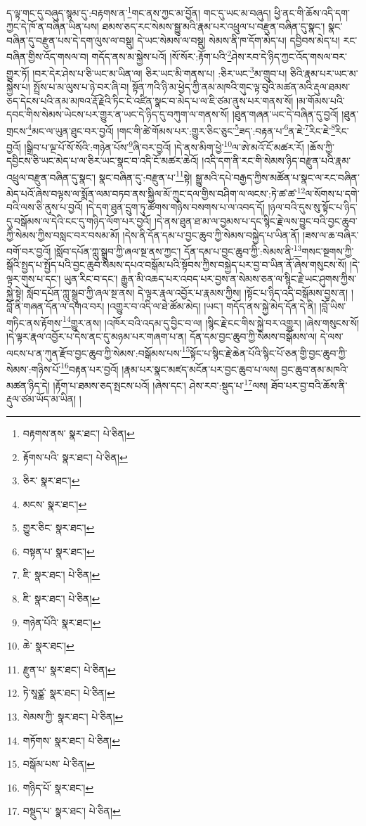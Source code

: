 ད་ལྟ་གང་དུ་བཞུད་སྙམ་དུ་:བརྟགས་ན་\footnote{བརྟགས་ནས་  སྣར་ཐང་།  པེ་ཅིན། }གང་ནས་ཀྱང་མ་བྱོན། གང་དུ་ཡང་མ་བཞུད། ཕྱི་ནང་གི་ཆོས་འདི་དག་ཀྱང་དེ་ཁོ་ན་བཞིན་ཡིན་པས། ཐམས་ཅད་རང་སེམས་སྒྱུ་མའི་རྣམ་པར་འཕྲུལ་པ་བརྫུན་བཞིན་དུ་སྣང་། སྣང་བཞིན་དུ་བརྫུན་པས་དེ་དག་ལུས་ལ་བསྡུ། དེ་ཡང་སེམས་ལ་བསྡུ། སེམས་ནི་ཁ་དོག་མེད་པ། དབྱིབས་མེད་པ། རང་བཞིན་གྱིས་འོད་གསལ་བ། གདོད་ནས་མ་སྐྱེས་པའོ། །སོ་སོར་:རྟོག་པའི་\footnote{རྟོགས་པའི་  སྣར་ཐང་།  པེ་ཅིན། }ཤེས་རབ་དེ་ཉིད་ཀྱང་འོད་གསལ་བར་གྱུར་ཏོ། །བར་དེར་ཤེས་པ་ཅི་ཡང་མ་ཡིན་ལ། ཅིར་ཡང་མི་གནས་པ། :ཅིར་ཡང་\footnote{ཅིར་  སྣར་ཐང་། }མ་གྲུབ་པ། ཅིའི་རྣམ་པར་ཡང་མ་སྐྱེས་པ། སྤྲོས་པ་མ་ལུས་པ་ཉེ་བར་ཞི་བ། སྟོན་ཀའི་ཉི་མ་ཕྱེད་ཀྱི་ནམ་མཁའི་གུང་ལྟ་བུའི་མཚན་མའི་རྡུལ་ཐམས་ཅད་དེངས་པའི་ནམ་མཁའ་རྡོ་རྗེའི་ཏིང་ངེ་འཛིན་སྣང་བ་མེད་པ་ལ་ཇི་ཙམ་ནུས་པར་གནས་སོ། །མ་གོམས་པའི་དབང་གིས་སེམས་ཡེངས་པར་གྱུར་ན་ཡང་དེ་ཉིད་དུ་བཀུག་ལ་གནས་སོ། །ཐུན་གཞན་ཡང་དེ་བཞིན་དུ་བྱའོ། །ཐུན་གྲངས་\footnote{མངས་  སྣར་ཐང་། }མང་ལ་ཡུན་ཐུང་བར་བྱའོ། །གང་གི་ཚེ་གོམས་པར་:གྱུར་ཅིང་ཅུང་\footnote{གྱུར་ཅིང་  སྣར་ཐང་། }ཟད་:བརྟན་པ་\footnote{བསྟན་པ་  སྣར་ཐང་། }ན་ཇེ་\footnote{ཇི་  སྣར་ཐང་།  པེ་ཅིན། }རིང་ཇེ་\footnote{ཇི་  སྣར་ཐང་།  པེ་ཅིན། }རིང་བྱའོ། །སྒྲིབ་པ་ལྔ་པོ་སོ་སོའི་:གཉེན་པོས་\footnote{གཉེན་པོའི་  སྣར་ཐང་། }ཞི་བར་བྱའོ། །དེ་ནས་མིག་ཕྱེ་\footnote{ཆེ་  སྣར་ཐང་། }ལ་ཨེ་མའོ་ངོ་མཚར་རོ། །ཆོས་ཀྱི་དབྱིངས་ཅི་ཡང་མེད་པ་ལ་ཅིར་ཡང་སྣང་བ་འདི་ངོ་མཚར་ཆེའོ། །འདི་དག་ནི་རང་གི་སེམས་ཉིད་བརྫུན་པའི་རྣམ་འཕྲུལ་བརྫུན་བཞིན་དུ་སྣང་། སྣང་བཞིན་དུ་:བརྫུན་པ་\footnote{རྫུན་པ་  སྣར་ཐང་།  པེ་ཅིན། }སྟེ། སྒྱུ་མའི་དཔེ་བརྒྱད་ཀྱིས་མཚོན་པ་སྣང་ལ་རང་བཞིན་མེད་པའོ་ཞེས་བལྟས་ལ་སྨོན་ལམ་བཏབ་ནས་སྐྱིལ་མོ་ཀྲུང་དལ་གྱིས་བཤིག་ལ་ལངས་:ཏེ་ཚ་ཚ་\footnote{ཏེ་སཱཙྪ་  སྣར་ཐང་།  པེ་ཅིན། }ལ་སོགས་པ་དགེ་བའི་ལས་ཅི་ནུས་པ་བྱའོ། །དེ་དག་ཐུན་དྲུག་ཏུ་ཚོགས་གཉིས་བསགས་པ་ལ་འབད་དོ། །ཉལ་བའི་དུས་སུ་སྟོང་པ་ཉིད་དུ་བསྒོམས་ལ་དེའི་ངང་དུ་གཉིད་ལོག་པར་བྱའོ། །དེ་ནས་ཐུན་ཐ་མ་ལ་བྱམས་པ་དང་སྙིང་རྗེ་ལས་བྱུང་བའི་བྱང་ཆུབ་ཀྱི་སེམས་ཀྱིས་བསླང་བར་བསམ་མོ། །དེས་ནི་དོན་དམ་པ་བྱང་ཆུབ་ཀྱི་སེམས་བསྐྱེད་པ་ཡིན་ནོ། །ཟས་ལ་ཆ་བཞིར་བགོ་བར་བྱའོ། །སློབ་དཔོན་ཀླུ་སྒྲུབ་ཀྱི་ཞལ་སྔ་ནས་ཀྱང་། དོན་དམ་པ་བྱང་ཆུབ་ཀྱི་:སེམས་ནི་\footnote{སེམས་ཀྱི་  སྣར་ཐང་།  པེ་ཅིན། }གསང་སྔགས་ཀྱི་སྒོའི་སྤྱད་པ་སྤྱོད་པའི་བྱང་ཆུབ་སེམས་དཔའ་བསྒོམ་པའི་སྟོབས་ཀྱིས་བསྐྱེད་པར་བྱ་བ་ཡིན་ནོ་ཞེས་གསུངས་སོ། །དེ་ལྟར་གུས་པ་དང་། ཡུན་རིང་བ་དང་། རྒྱུན་མི་འཆད་པར་འབད་པར་བྱས་ན་སེམས་ཅན་ལ་སྙིང་རྗེ་ཡང་ཤུགས་ཀྱིས་སྐྱེ་སྟེ། སློབ་དཔོན་ཀླུ་སྒྲུབ་ཀྱི་ཞལ་སྔ་ནས། དེ་ལྟར་རྣལ་འབྱོར་པ་རྣམས་ཀྱིས། །སྟོང་པ་ཉིད་འདི་བསྒོམས་བྱས་ན། །བློ་ནི་གཞན་དོན་ལ་དགའ་བར། །འགྱུར་བ་འདི་ལ་ཐེ་ཚོམ་མེད། །ཡང་། གདོད་ནས་སྐྱེ་མེད་དོན་དེ་ནི། །བློ་ཡིས་གཏིང་ནས་རྟོགས་\footnote{གཏོགས་  སྣར་ཐང་།  པེ་ཅིན། }གྱུར་ནས། །འཁོར་བའི་འདམ་དུ་བྱིང་བ་ལ། །སྙིང་རྗེ་ངང་གིས་སྐྱེ་བར་འགྱུར། །ཞེས་གསུངས་སོ། །དེ་ལྟར་རྣལ་འབྱོར་པ་དེས་ནང་དུ་མཉམ་པར་གཞག་པ་ན། དོན་དམ་བྱང་ཆུབ་ཀྱི་སེམས་བསྒོམས་ལ། དེ་ལས་ལངས་པ་ན་ཀུན་རྫོབ་བྱང་ཆུབ་ཀྱི་སེམས་:བསྒོམས་པས་\footnote{བསྒོམ་པས་  པེ་ཅིན། }སྟོང་པ་སྙིང་རྗེ་ཆེན་པོའི་སྙིང་པོ་ཅན་གྱི་བྱང་ཆུབ་ཀྱི་སེམས་:གཉིས་པོ་\footnote{གཉིད་པོ་  སྣར་ཐང་། }བརྟན་པར་བྱའོ། །རྣམ་པར་སྣང་མཛད་མངོན་པར་བྱང་ཆུབ་པ་ལས། བྱང་ཆུབ་ནམ་མཁའི་མཚན་ཉིད་དེ། །རྟོག་པ་ཐམས་ཅད་སྤངས་པའོ། །ཞེས་དང་། ཤེས་རབ་:སྡུད་པ་\footnote{བསྡུད་པ་  སྣར་ཐང་།  པེ་ཅིན། }ལས། ཐོབ་པར་བྱ་བའི་ཆོས་ནི་རྡུལ་ཙམ་ཡོད་མ་ཡིན། །
